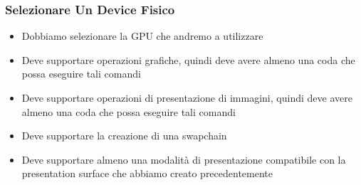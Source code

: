 \begin{frame}
\frametitle{Selezionare Un Device Fisico}

\begin{itemize}
\item Dobbiamo selezionare la GPU che andremo a utilizzare
\item Deve supportare operazioni grafiche, quindi deve avere almeno una coda che possa eseguire tali comandi
\item Deve supportare operazioni di presentazione di immagini, quindi deve avere almeno una coda che possa eseguire tali comandi
\item Deve supportare la creazione di una swapchain
\item Deve supportare almeno una modalità di presentazione compatibile con la presentation surface che abbiamo creato precedentemente
\end{itemize}

\end{frame}
